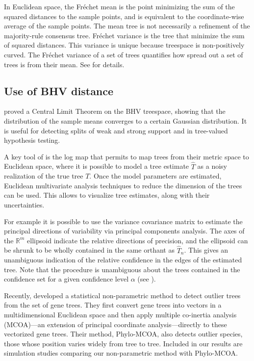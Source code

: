 In Euclidean space, the Fr\'echet mean is the point minimizing the sum of the squared distances to the sample points, and is equivalent to the coordinate-wise average of the sample points. The mean tree is not necessarily a refinement of the majority-rule consensus tree. Fr\'echet variance is the tree that minimize the sum of squared distances.  This variance is unique because treespace is non-positively curved. The Fr\'echet variance of a set of trees quantifies how spread out a set of trees is from their mean. See \cite{miller2015polyhedral,brown2017mean} for details.

\subsection{Use of BHV distance} \label{sec:means-and-variance}

\cite{barden2017logarithm} proved a Central Limit Theorem on the BHV treespace, showing that the distribution of the sample means converges to a certain Gaussian distribution. It is useful for detecting splits of weak and strong support and in tree-valued hypothesis testing.

A key tool of \cite{barden2014limiting}is  the log map  that permits to  map  trees  from  their  metric  space  to  Euclidean space, where it is possible to model a tree estimate $\hat T$ as a noisy realization of the true tree $T$. Once  the model parameters are estimated, Euclidean multivariate analysis techniques to reduce the dimension of the trees can be used. This allows to visualize tree estimates, along with their uncertainties.

For example it is possible to use the variance covariance matrix to  estimate  the  principal  directions  of  variability  via principal components analysis. The axes of the $\mathbb{R}^m$ ellipsoid indicate the relative directions of precision, and the ellipsoid can be shrunk  to be wholly contained in the same orthant as $\hat T_n$. This gives an unambiguous indication of the relative
confidence in the edges of the estimated tree. Note that the procedure is unambiguous about the trees contained in the confidence set for a given confidence level $\alpha$ (see \cite{willis2016confidence}).

Recently, \cite{de2012phylo} developed a statistical non-parametric method to detect outlier trees from the set of gene trees. They first convert gene trees into vectors in a multidimensional Euclidean space and then apply multiple co-inertia analysis (MCOA)—an extension of principal coordinate analysis—directly to these vectorized gene trees. Their method, Phylo-MCOA, also detects outlier species, those whose position varies widely from tree to tree. Included in our results are simulation studies comparing our non-parametric method with Phylo-MCOA.


